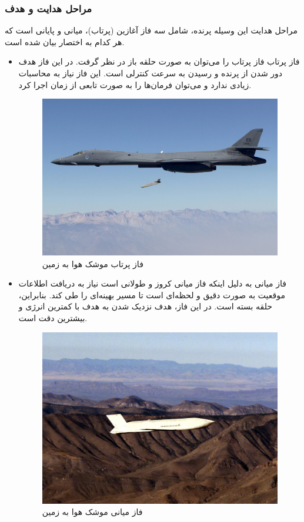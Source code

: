 \subsubsection{مراحل هدایت و هدف}
مراحل هدایت این وسیله پرنده، شامل سه فاز آغازین (پرتاب)، میانی و پایانی است که هر کدام به اختصار بیان شده است.
\begin{itemize}
	\item فاز پرتاب
	فاز پرتاب را می‌توان به صورت حلقه باز در نظر گرفت. در این فاز هدف دور شدن از پرنده و رسیدن به سرعت کنترلی است. 
	این فاز نیاز به محاسبات زیادی ندارد و می‌توان فرمان‌ها را به صورت تابعی از زمان اجرا کرد.
	 \begin{figure}[H]
		\centering
		\includegraphics[width=\linewidth]{../Figure/Q1/start.jpg}
		\caption{فاز پرتاب موشک هوا به زمین
		}
	\end{figure}
	
	\item فاز میانی
	به دلیل اینکه فاز میانی کروز و طولانی است نیاز به دریافت اطلاعات موقعیت به صورت دقیق و لحظه‌ای است تا مسیر بهینه‌ای را طی کند. بنابراین، حلقه بسته است. در این فاز، هدف نزدیک شدن به هدف با کمترین انرژی و بیشترین دقت است.
		 \begin{figure}[H]
		\centering
		\includegraphics[width=\linewidth]{../Figure/Q1/cruise.jpg}
		\caption{فاز میانی موشک هوا به زمین
		}
	\end{figure}


\end{itemize}
